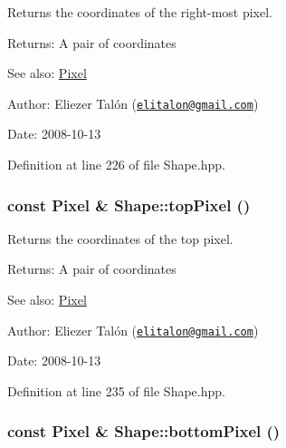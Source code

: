 Returns the coordinates of the right-most pixel. 

\begin{Desc}
\item[Returns:]A pair of coordinates\end{Desc}
\begin{Desc}
\item[See also:]\hyperlink{_pixel_8hpp_535e59456e3e633842529cfa8ea103c4}{Pixel}\end{Desc}
\begin{Desc}
\item[Author:]Eliezer Talón (\href{mailto:elitalon@gmail.com}{\tt elitalon@gmail.com}) \end{Desc}
\begin{Desc}
\item[Date:]2008-10-13 \end{Desc}


Definition at line 226 of file Shape.hpp.\hypertarget{class_shape_070525c7002c5f02361a102d0351520e}{
\subsubsection[topPixel]{\setlength{\rightskip}{0pt plus 5cm}const {\bf Pixel} \& Shape::topPixel ()}}
\label{class_shape_070525c7002c5f02361a102d0351520e}


Returns the coordinates of the top pixel. 

\begin{Desc}
\item[Returns:]A pair of coordinates\end{Desc}
\begin{Desc}
\item[See also:]\hyperlink{_pixel_8hpp_535e59456e3e633842529cfa8ea103c4}{Pixel}\end{Desc}
\begin{Desc}
\item[Author:]Eliezer Talón (\href{mailto:elitalon@gmail.com}{\tt elitalon@gmail.com}) \end{Desc}
\begin{Desc}
\item[Date:]2008-10-13 \end{Desc}


Definition at line 235 of file Shape.hpp.\hypertarget{class_shape_0454e59e7572927e4a29b40c950bc52f}{
\subsubsection[bottomPixel]{\setlength{\rightskip}{0pt plus 5cm}const {\bf Pixel} \& Shape::bottomPixel ()}}
\label{class_shape_0454e59e7572927e4a29b40c950bc52f}


